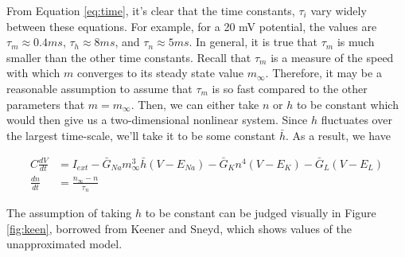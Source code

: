 \documentclass[12]{book}
\newcommand\0{\mathbf{0}}
\newcommand\<{\langle}
\renewcommand\>{\rangle}
\begin{document}
From Equation \ref{eq:time}, it's clear that the time constants, $\tau_i$ vary widely between these equations. For example, for a 20 mV potential, the values are $\tau_m \approx 0.4 ms$, $\tau_h \approx 8 ms$, and $\tau_n \approx 5 ms$. In general, it is true that $\tau_m$ is much smaller than the other time constants. Recall that $\tau_m$ is a measure of the speed with which $m$ converges to its steady state value $m_\infty$. Therefore, it may be a reasonable assumption to assume that $\tau_m$ is so fast compared to the other parameters that $m = m_\infty$. Then, we can either take $n$ or $h$ to be constant which would then give us a two-dimensional nonlinear system. Since $h$ fluctuates over the largest time-scale, we'll take it to be some constant $\bar{h}$. As a result, we have 

\begin{align*}
        C\frac{dV}{dt} &= I_{ext} -\bar{G}_{Na}m_\infty^3\bar{h}(V-E_{Na}) -\bar{G}_{K}n^4(V-E_{K})  -\bar{G}_{L}(V-E_{L}) \\
    \frac{dn}{dt} &= \frac{n_{\infty}-n}{\tau_n} 
\end{align*}

The assumption of taking $h$ to be constant can be judged visually in Figure \ref{fig:keen}, borrowed from Keener and Sneyd, which shows values of the unapproximated model\cite{keener}.
\end{document}
